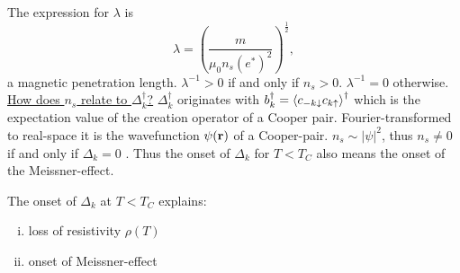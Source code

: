 The expression for $\lambda$ is
\begin{equation}
	\lambda = \left( \frac{m}{\mu_0n_s\left( e^* \right)^2} \right)^\frac{1}{2},
\end{equation}
a magnetic penetration length. $\lambda^{-1} > 0 $ if and only if $n_s >0$. $\lambda^{-1}=0$ otherwise. 
\underline{How does $n_s$ relate to $\Delta_k^\dagger$?}
$\Delta_k^\dagger$ originates with $b_k^\dagger = \ev{c_{-k\downarrow}c_{k\uparrow}}^\dagger$ which is the expectation value of the creation operator of a Cooper pair. Fourier-transformed to real-space it is the wavefunction $\psi(\vb r)$ of a Cooper-pair. $n_s \sim |\psi|^2$, thus $n_s \ne 0$ if and only if $\Delta_k=0$ .
Thus the onset of $\Delta_k$ for $T<T_C$ also means the onset of the Meissner-effect. 
\begin{tcolorbox}[center, width = 0.6\textwidth]
The onset of $\Delta_k$ at $T<T_C$ explains:
\begin{enumerate}[i)]
	\item loss of resistivity $\rho(T)$
	\item onset of Meissner-effect
\end{enumerate}
\end{tcolorbox}  